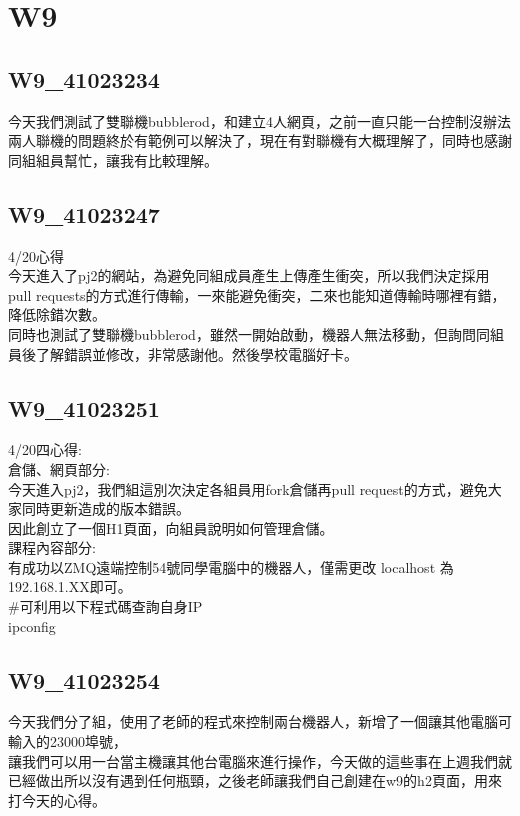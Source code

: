 \chapter{W9}
\section{W9_41023234}
 今天我們測試了雙聯機bubblerod，和建立4人網頁，之前一直只能一台控制沒辦法兩人聯機的問題終於有範例可以解決了，現在有對聯機有大概理解了，同時也感謝同組組員幫忙，讓我有比較理解。\\[6pt]


\section{W9_41023247}
 4/20心得\\

今天進入了pj2的網站，為避免同組成員產生上傳產生衝突，所以我們決定採用pull requests的方式進行傳輸，一來能避免衝突，二來也能知道傳輸時哪裡有錯，降低除錯次數。\\
同時也測試了雙聯機bubblerod，雖然一開始啟動，機器人無法移動，但詢問同組員後了解錯誤並修改，非常感謝他。然後學校電腦好卡。\\

\section{W9_41023251}
 4/20四心得:\\

倉儲、網頁部分:\\

今天進入pj2，我們組這別次決定各組員用fork倉儲再pull request的方式，避免大家同時更新造成的版本錯誤。\\
因此創立了一個H1頁面，向組員說明如何管理倉儲。\\


課程內容部分:\\

有成功以ZMQ遠端控制54號同學電腦中的機器人，僅需更改 localhost 為192.168.1.XX即可。\\
#可利用以下程式碼查詢自身IP\\
	
ipconfig\\

\section{W9_41023254}
今天我們分了組，使用了老師的程式來控制兩台機器人，新增了一個讓其他電腦可輸入的23000埠號，\\
讓我們可以用一台當主機讓其他台電腦來進行操作，今天做的這些事在上週我們就已經做出所以沒有遇到任何瓶頸，之後老師讓我們自己創建在w9的h2頁面，用來打今天的心得。\\


\newpage